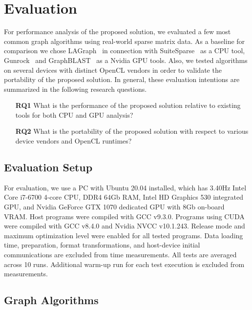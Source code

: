 \section{Evaluation}

For performance analysis of the proposed solution, we evaluated a few most common graph algorithms using real-world sparse matrix data. 
As a baseline for comparison we chose LAGraph~\cite{szarnyas2021lagraph} in connection with SuiteSparse~\cite{10.1145/3322125} as a CPU tool, Gunrock~\cite{7967137} and GraphBLAST~\cite{yang2019graphblast} as a Nvidia GPU tools. 
Also, we tested algorithms on several devices with distinct OpenCL vendors in order to validate the portability of the proposed solution. 
In general, these evaluation intentions are summarized in the following research questions. 

\vspace{0.2cm}
\begin{itemize}
    \item[\textbf{RQ1}] What is the performance of the proposed solution relative to existing tools for both CPU and GPU analysis?
    
    \item[\textbf{RQ2}] What is the portability of the proposed solution with respect to various device vendors and OpenCL runtimes?
\end{itemize}

\subsection{Evaluation Setup}

For evaluation, we use a PC with Ubuntu 20.04 installed, which has 3.40Hz Intel Core i7-6700 4-core CPU, DDR4 64Gb RAM, Intel HD Graphics 530 integrated GPU, and Nvidia GeForce GTX 1070 dedicated GPU with 8Gb on-board VRAM. 
Host programs were compiled with GCC v9.3.0. Programs using CUDA were compiled with GCC v8.4.0 and Nvidia NVCC v10.1.243.
Release mode and maximum optimization level were enabled for all tested programs. 
Data loading time, preparation, format transformations, and host-device initial communications are excluded from time measurements. 
All tests are averaged across 10 runs.
Additional warm-up run for each test execution is excluded from measurements.

\subsection{Graph Algorithms}

